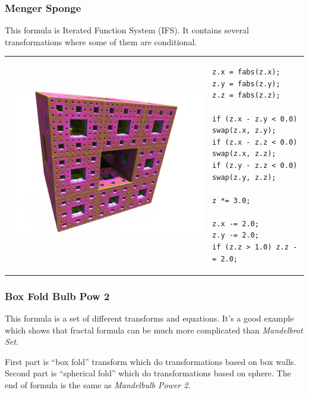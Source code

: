 \subsubsection{Menger Sponge} \nopagebreak

This formula is Iterated Function System (IFS). It contains several
transformations where some of them are conditional. \nopagebreak

\begin{tabular}{l l}
	\includegraphics[width=0.3\linewidth]{img/manual/media/formula_menger_sponge.png}	
	& 
	\begin{minipage}[b]{0.5\linewidth}
	\begin{lstlisting}
z.x = fabs(z.x);
z.y = fabs(z.y);
z.z = fabs(z.z);
		
if (z.x - z.y < 0.0) swap(z.x, z.y);
if (z.x - z.z < 0.0) swap(z.x, z.z);
if (z.y - z.z < 0.0) swap(z.y, z.z);
		
z *= 3.0;
		
z.x -= 2.0;
z.y -= 2.0;
if (z.z > 1.0) z.z -= 2.0;
        \end{lstlisting}
	\end{minipage}
\end{tabular} 

\subsubsection{Box Fold Bulb Pow 2}
\nopagebreak

This formula is a set of different transforms and equations. It's a good example
which shows that fractal formula can be much more complicated than
\emph{Mandelbrot Set}.

First part is ``box fold'' transform which do
transformations based on box walls. Second part is ``spherical
fold'' which do transformations based on sphere.
The end of formula is the same as \emph{Mandelbulb Power 2}. \nopagebreak

